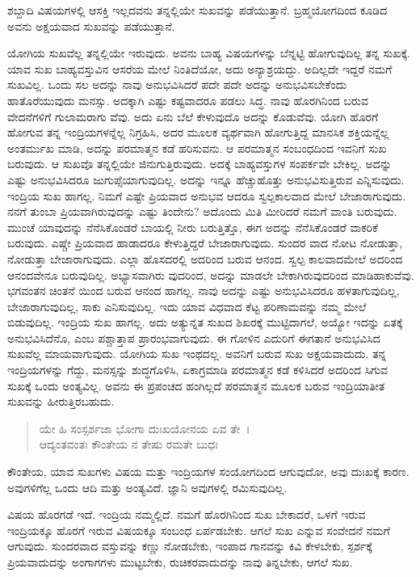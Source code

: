 {\small ಶಬ್ದಾದಿ ವಿಷಯಗಳಲ್ಲಿ ಆಸಕ್ತಿ ಇಲ್ಲದವನು ತನ್ನಲ್ಲಿಯೇ ಸುಖವನ್ನು ಪಡೆಯುತ್ತಾನೆ. ಬ್ರಹ್ಮಯೋಗದಿಂದ ಕೂಡಿದ ಅವನು ಅಕ್ಷಯವಾದ ಸುಖವನ್ನು ಪಡೆಯುತ್ತಾನೆ.}

ಯೋಗಿಯ ಸುಖವೆಲ್ಲ ತನ್ನಲ್ಲಿಯೇ ಇರುವುದು. ಅವನು ಬಾಹ್ಯ ವಿಷಯಗಳನ್ನು ಬೆನ್ನಟ್ಟಿ ಹೋಗುವುದಿಲ್ಲ ತನ್ನ ಸುಖಕ್ಕೆ. ಯಾವ ಸುಖ ಬಾಹ್ಯವಸ್ತುವಿನ ಆಸರೆಯ ಮೇಲೆ ನಿಂತಿದೆಯೋ, ಅದು ಅನ್ಯಾಶ್ರಯದ್ದು. ಅದಿಲ್ಲದೇ ಇದ್ದರೆ ನಮಗೆ ಸುಖವಿಲ್ಲ. ಒಂದು ಸಲ ಅದನ್ನು ನಾವು ಅನುಭವಿಸಿದರೆ ಪದೇ ಪದೇ ಅದನ್ನು ಅನುಭವಿಸಬೇಕೆಂದು ಹಾತೊರೆಯುವುದು ಮನಸ್ಸು. ಅದಕ್ಕಾಗಿ ಎಷ್ಟು ಕಷ್ಟವಾದರೂ ಪಡಲು ಸಿದ್ಧ. ನಾವು ಹೊರಗಿನಿಂದ ಬರುವ ವೇದನೆಗಳಿಗೆ ಗುಲಾಮರಾಗು ವೆವು. ಅದು ಏನು ಬೆಲೆ ಕೇಳುವುದೊ ಅದನ್ನು ಕೊಡುವೆವು. ಯೋಗಿ ಹೊರಗೆ ಹೋಗುವ ತನ್ನ ಇಂದ್ರಿಯಗಳನ್ನೆಲ್ಲ ನಿಗ್ರಹಿಸಿ, ಅದರ ಮೂಲಕ ವ್ಯರ್ಥವಾಗಿ ಹೋಗುತ್ತಿದ್ದ ಮಾನಸಿಕ ಶಕ್ತಿಯನ್ನೆಲ್ಲ ಅಂತರ್ಮುಖ ಮಾಡಿ, ಅದನ್ನು ಪರಮಾತ್ಮನ ಕಡೆ ಹರಿಸುವನು. ಆ ಪರಮಾತ್ಮನ ಸಂಬಂಧದಿಂದ ಇವನಿಗೆ ಸುಖ ಬರುವುದು. ಆ ಸುಖವೊ ತನ್ನಲ್ಲಿಯೇ ಜಿನುಗುತ್ತಿರುವುದು. ಅದಕ್ಕೆ ಬಾಹ್ಯವಸ್ತುಗಳ ಸಂಪರ್ಕವೇ ಬೇಕಿಲ್ಲ. ಅದನ್ನು ಎಷ್ಟು ಅನುಭವಿಸಿದರೂ ಜುಗುಪ್ಸೆಯಾಗುವುದಿಲ್ಲ. ಅದನ್ನು ಇನ್ನೂ ಹೆಚ್ಚುಹೊತ್ತು ಅನುಭವಿಸುತ್ತಿರುವ ಎನ್ನಿಸುವುದು. ಇಂದ್ರಿಯ ಸುಖ ಹಾಗಲ್ಲ. ನಿಮಗೆ ಎಷ್ಟೇ ಪ್ರಿಯವಾದ ಅನುಭವ ಆದರೂ ಸ್ವಲ್ಪಕಾಲವಾದ ಮೇಲೆ ಬೇಜಾರಾಗುವುದು. ನನಗೆ ತುಂಬಾ ಪ್ರಿಯವಾಗಿರುವುದನ್ನು ಎಷ್ಟು ತಿಂದೇನು? ಅದೊಂದು ಮಿತಿ ಮೀರಿದರೆ ನಮಗೆ ವಾಂತಿ ಬರುವುದು. ಮುಂಚೆ ಯಾವುದನ್ನು ನೆನೆಸಿಕೊಂಡರೆ ಬಾಯಲ್ಲಿ ನೀರು ಬರುತ್ತಿತ್ತೊ, ಈಗ ಅದನ್ನು ನೆನೆಸಿಕೊಂಡರೆ ವಾಕರಿಕೆ ಬರುವುದು. ಎಷ್ಚೇ ಪ್ರಿಯವಾದ ಹಾಡಾದರೂ ಕೇಳುತ್ತಿದ್ದರೆ ಬೇಜಾರಾಗುವುದು. ಸುಂದರ ವಾದ ನೋಟ ನೋಡುತ್ತಾ, ನೋಡುತ್ತಾ ಬೇಜಾರಾಗುವುದು. ಎಲ್ಲಾ ಹೊಸದರಲ್ಲಿ ಅದರಿಂದ ಬರುವ ಆನಂದ. ಸ್ವಲ್ಪ ಕಾಲವಾದಮೇಲೆ ಅದರಿಂದ ಆನಂದವೇನೂ ಬರುವುದಿಲ್ಲ. ಅಭ್ಯಾಸವಾಗಿರು ವುದರಿಂದ, ಅದನ್ನು ಮಾಡಲೇ ಬೇಕಾಗಿರುವುದರಿಂದ ಮಾಡಿಹಾಕುವೆವು. ಭಗವಂತನ ಚಿಂತನೆ ಯಿಂದ ಬರುವ ಆನಂದ ಹಾಗಲ್ಲ. ನಾವು ಅದನ್ನು ಎಷ್ಟು ಅನುಭವಿಸಿದರೂ ಹಳತಾಗುವುದಿಲ್ಲ, ಬೇಜಾರಾಗುವುದಿಲ್ಲ, ಸಾಕು ಎನಿಸುವುದಿಲ್ಲ. ಇದು ಯಾವ ವಿಧವಾದ ಕೆಟ್ಟ ಪರಿಣಾಮವನ್ನು ನಮ್ಮ ಮೇಲೆ ಬಿಡುವುದಿಲ್ಲ. ಇಂದ್ರಿಯ ಸುಖ ಹಾಗಲ್ಲ. ಅದು ಅತ್ಯುನ್ನತ ಸುಖದ ಶಿಖರಕ್ಕೆ ಮುಟ್ಟಿದಾಗಲೆ, ಅಯ್ಯೋ ಇದನ್ನು ಏತಕ್ಕೆ ಅನುಭವಿಸಿದೆನೊ, ಎಂಬ ಪಶ್ಚಾತ್ತಾಪ ಪ್ರಾರಂಭವಾಗುವುದು. ಈ ಗೋಳಿನ ಎದುರಿಗೆ ಈಗತಾನೆ ಅನುಭವಿಸಿದ ಸುಖವೆಲ್ಲ ಮಾಯವಾಗುವುದು. ಯೋಗಿಯ ಸುಖ ಇಂಥದಲ್ಲ. ಅವನಿಗೆ ಬರುವ ಸುಖ ಅಕ್ಷಯವಾದುದು. ತನ್ನ ಇಂದ್ರಿಯಗಳನ್ನು ಗೆದ್ದು, ಮನಸ್ಸನ್ನು ಶುದ್ಧಗೊಳಿಸಿ, ಏಕಾಗ್ರಮಾಡಿ ಪರಮಾತ್ಮನ ಕಡೆ ಕಳಿಸಿದರೆ ಅದರಿಂದ ಸಿಗುವ ಸುಖಕ್ಕೆ ಒಂದು ಅಂತ್ಯವಿಲ್ಲ. ಅವನು ಈ ಪ್ರಪಂಚದ ಹಂಗಿಲ್ಲದೆ ಪರಮಾತ್ಮನ ಮೂಲಕ ಬರುವ ಇಂದ್ರಿಯಾತೀತ ಸುಖವನ್ನು ಹೀರುತ್ತಿರಬಹುದು.

\begin{verse}
ಯೇ ಹಿ ಸಂಸ್ಪರ್ಶಜಾ ಭೋಗಾ ದುಃಖಯೋನಯ ಏವ ತೇ~।\\ಆದ್ಯಂತವಂತಃ ಕೌಂತೇಯ ನ ತೇಷು ರಮತೇ ಬುಧಃ 
\end{verse}

{\small ಕೌಂತೇಯ, ಯಾವ ಸುಖಗಳು ವಿಷಯ ಮತ್ತು ಇಂದ್ರಿಯಗಳ ಸಂಯೋಗದಿಂದ ಆಗುವುದೋ, ಅವು ದುಃಖಕ್ಕೆ ಕಾರಣ. ಅವುಗಳಿಗೆಲ್ಲ ಒಂದು ಆದಿ ಮತ್ತು ಅಂತ್ಯವಿದೆ. ಜ್ಞಾನಿ ಅವುಗಳಲ್ಲಿ ರಮಿಸುವುದಿಲ್ಲ.}

ವಿಷಯ ಹೊರಗಡೆ ಇದೆ. ಇಂದ್ರಿಯ ನಮ್ಮಲ್ಲಿದೆ. ನಮಗೆ ಹೊರಗಿನಿಂದ ಸುಖ ಬೇಕಾದರೆ, ಒಳಗೆ ಇರುವ ಇಂದ್ರಿಯಕ್ಕೂ ಹೊರಗೆ ಇರುವ ವಿಷಯಕ್ಕೂ ಸಂಬಂಧ ಏರ್ಪಡಬೇಕು. ಆಗಲೆ ಸುಖ ಎನ್ನುವ ಸಂವೇದನೆ ನಮಗೆ ಆಗುವುದು. ಸುಂದರವಾದ ವಸ್ತುವನ್ನು ಕಣ್ಣು ನೋಡಬೇಕು, ಇಂಪಾದ ಗಾನವನ್ನು ಕಿವಿ ಕೇಳಬೇಕು, ಸ್ಪರ್ಶಕ್ಕೆ ಪ್ರಿಯವಾದುದನ್ನು ಅಂಗಾಗಗಳು ಮುಟ್ಟಬೇಕು, ರುಚಿಕರವಾದುದನ್ನು ನಾವು ತಿನ್ನಬೇಕು, ಆಗಲೆ ಸುಖ.

